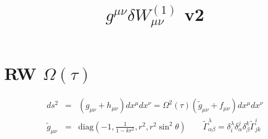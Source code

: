 \documentclass[10pt,letterpaper]{article}
\title{$g^{\mu\nu}\delta W^{(1)}_{\mu\nu}$ v2}
\date{}
\numberwithin{equation}{section}
\begin{document}
 
\maketitle
\noindent 
\section{RW $\Omega(\tau)$}
\begin{eqnarray}
ds^2 &=& (g_{\mu\nu} + h_{\mu\nu})dx^\mu dx^\nu = \Omega^2(\tau)(\tilde g_{\mu\nu} + f_{\mu\nu})dx^\mu dx^\nu
\\
\tilde g_{\mu\nu} &=& \text{diag}\left(-1,\frac{1}{1-kr^2},r^2,r^2\sin^2\theta\right)\qquad \tilde \Gamma^{\lambda}_{\alpha\beta} = \delta^\lambda_i \delta^j_\alpha \delta^k_\beta \tilde \Gamma^{i}_{jk}
\end{eqnarray}
%
\end{document}
